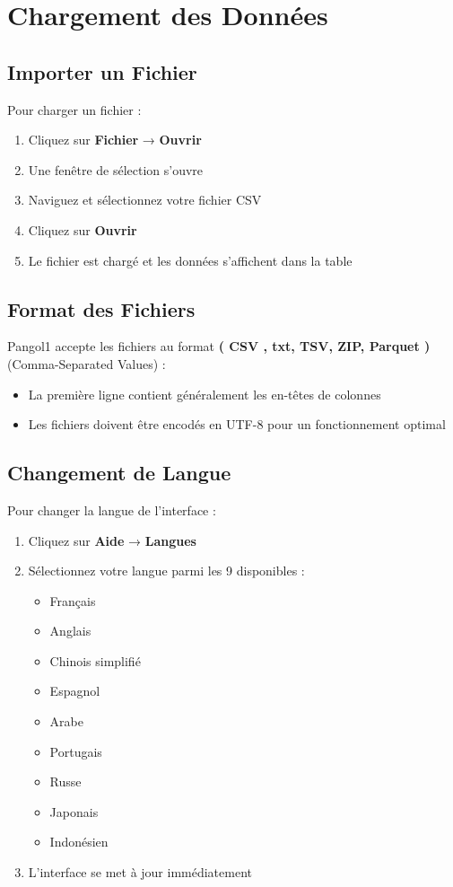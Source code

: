 \documentclass[11pt, a4paper]{article}
\begin{document}
\section{Chargement des Données}

\subsection{Importer un Fichier}
Pour charger un fichier :

\begin{enumerate}
    \item Cliquez sur \textbf{Fichier} → \textbf{Ouvrir}
    \item Une fenêtre de sélection s'ouvre
    \item Naviguez et sélectionnez votre fichier CSV
    \item Cliquez sur \textbf{Ouvrir}
    \item Le fichier est chargé et les données s'affichent dans la table
\end{enumerate}

\subsection{Format des Fichiers}
Pangol1 accepte les fichiers au format \textbf{( CSV , txt, TSV, ZIP, Parquet )} (Comma-Separated Values) :

\begin{itemize}
    \item La première ligne contient généralement les en-têtes de colonnes
    \item Les fichiers doivent être encodés en UTF-8 pour un fonctionnement optimal
\end{itemize}

\subsection{Changement de Langue}
Pour changer la langue de l'interface :

\begin{enumerate}
    \item Cliquez sur \textbf{Aide} → \textbf{Langues}
    \item Sélectionnez votre langue parmi les 9 disponibles :
    \begin{itemize}
        \item Français
        \item Anglais
        \item Chinois simplifié
        \item Espagnol
        \item Arabe
        \item Portugais
        \item Russe
        \item Japonais
        \item Indonésien
    \end{itemize}
    \item L'interface se met à jour immédiatement
\end{enumerate}
\end{document}
